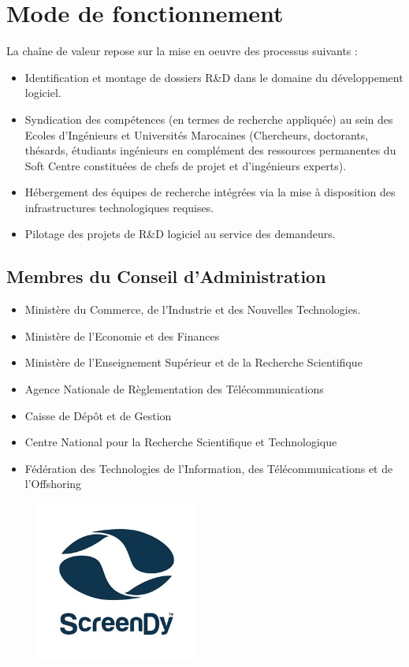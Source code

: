 \documentclass[12pt,a4paper]{report}
\begin{document}
 	\section{Mode de fonctionnement}
 La chaîne de valeur repose sur la mise en oeuvre des processus suivants :\newline
 	\begin{itemize}
 		\item Identification et montage de dossiers R\&D dans le domaine du développement logiciel.
		\item Syndication des compétences (en termes de recherche appliquée) au sein des Ecoles d’Ingénieurs et Universités Marocaines (Chercheurs, doctorants, thésards, étudiants ingénieurs en complément des ressources permanentes du Soft Centre constituées de chefs de projet et d’ingénieurs experts). 
		\item Hébergement des équipes de recherche intégrées via 
la mise à disposition des infrastructures technologiques requises.
		\item Pilotage des projets de R\&D logiciel au service des demandeurs.
	\end{itemize}

	\subsection{Membres du Conseil d'Administration}
 	\begin{itemize}
		\item Ministère du Commerce, de l’Industrie et des Nouvelles Technologies.
		\item Ministère de l’Economie et des Finances
		\item Ministère de l’Enseignement Supérieur et de la Recherche Scientifique
		\item Agence Nationale de Règlementation des Télécommunications
		\item Caisse de Dépôt et de Gestion
		\item Centre National pour la Recherche Scientifique et Technologique
		\item Fédération des Technologies de l’Information, des Télécommunications et de l’Offshoring
	\end{itemize}

	\newpage

	\begin{figure}
	\includegraphics[scale=0.5]{./graphics/logo_screendy.png}
	\end{figure}
\end{document}
